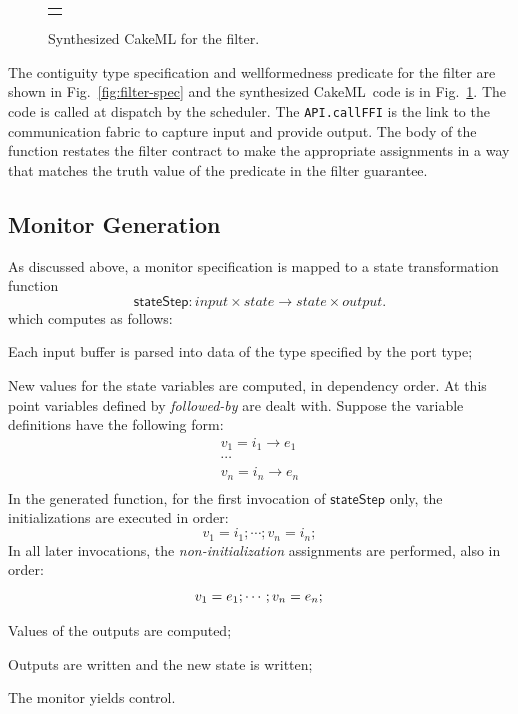 \documentclass[global,twocolumn]{svjour}
\newcommand{\konst}[1]{\ensuremath{\mathsf{#1}}}
\newcommand{\figref}[1]{Fig.~\ref{#1}}
\newcommand{\ckml}{CakeML}
\begin{document}
\begin{figure}
  \begin{center}
    \begin{tabular}{c}
      \resizebox{\columnwidth}{!}{\usebox{\cml}}
    \end{tabular}
  \end{center}
  \caption{Synthesized CakeML for the filter.}
  \label{fig:filter-cakeml}
\end{figure}

The contiguity type specification and wellformedness predicate for the filter are shown in \figref{fig:filter-spec} and the synthesized \ckml\ code is in \figref{fig:filter-cakeml}.
%
The code is called at dispatch by the scheduler.
%
The \texttt{API.callFFI} is the link to the communication fabric to capture input and provide output.
%
The body of the function restates the filter contract to make the appropriate assignments in a way that matches the truth value of the predicate in the filter guarantee.


\subsection{Monitor Generation}

As discussed above, a monitor specification is mapped to a state transformation function
%
\[
\konst{stateStep} : \mathit{input} \times \mathit{state} \to \mathit{state} \times \mathit{output}.
\]
%
which computes as follows:
%
\begin{compactenum}

\item Each input buffer is parsed into data of the type specified by the port type;

\item
New values for the state variables are computed, in dependency order.
%
At this point variables defined by \emph{followed-by} are dealt with.
%
Suppose the variable definitions have the following form:
%
\[
\begin{array}{l}
  v_1 = i_1 \longrightarrow e_1 \\
  \cdots \\
  v_n = i_n \longrightarrow e_n \\
\end{array}
\]
%
In the generated function, for the first invocation of \konst{stateStep} only, the initializations are executed in order:
%
\[
  v_1 = i_1; \cdots ;  v_n = i_n;
\]
%
In all later invocations, the \emph{non-initialization} assignments are performed, also in order:
%
\[
  v_1 = e_1; \cdots ; v_n = e_n; \\
\]

\item Values of the outputs are computed;

\item Outputs are written and the new state is written;

\item The monitor yields control.
\end{compactenum}
\end{document}
